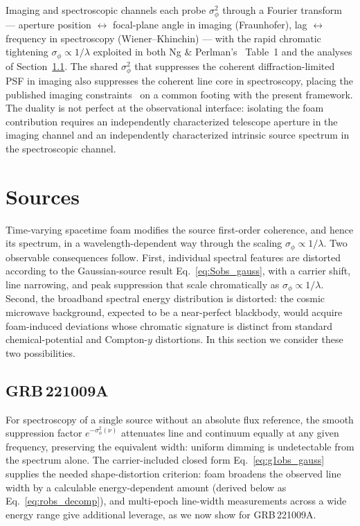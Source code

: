 \documentclass[aps,prd,onecolumn,amsmath,amssymb]{revtex4-2}
\begin{document}
Imaging and spectroscopic channels each probe $\sigma_\phi^2$ through
a Fourier transform --- aperture position $\leftrightarrow$ focal-plane
angle in imaging (Fraunhofer), lag $\leftrightarrow$ frequency in
spectroscopy (Wiener--Khinchin) --- with the rapid chromatic tightening
$\sigma_\phi\propto 1/\lambda$ exploited in both Ng \&
Perlman's~\cite{NgPerlman2022} Table~1 and the analyses of
Section~\ref{sec:grb221009a}.  The shared $\sigma_\phi^2$ that
suppresses the coherent diffraction-limited PSF in imaging also
suppresses the coherent line core in spectroscopy, placing the
published imaging
constraints~\cite{NgPerlman2022,LieuHillman2003,Christiansen2011,Perlman2015}
on a common footing with the present framework.  The duality is not
perfect at the observational interface: isolating the foam contribution
requires an independently characterized telescope aperture in the
imaging channel and an independently characterized intrinsic source
spectrum in the spectroscopic channel.

\section{Sources}
\label{sec:sources}

Time-varying spacetime foam modifies the source first-order coherence,
and hence its spectrum, in a wavelength-dependent way through
the scaling $\sigma_\phi \propto 1/\lambda$. Two observable
consequences follow. First, individual spectral features are distorted according to the
Gaussian-source result Eq.~\eqref{eq:Sobs_gauss}, with a carrier shift,
line narrowing, and peak suppression that scale chromatically as
$\sigma_\phi\propto1/\lambda$. Second, the
broadband spectral energy distribution is distorted: the cosmic
microwave background, expected to be a near-perfect blackbody, would
acquire foam-induced deviations whose chromatic signature is distinct
from standard chemical-potential and Compton-$y$ distortions.
In this section we consider these two possibilities.

\subsection{GRB\,221009A}
\label{sec:grb221009a}

For spectroscopy of a single source without an absolute flux reference,
the smooth suppression factor $e^{-\sigma_\phi^2(\nu)}$ attenuates line
and continuum equally at any given frequency, preserving the equivalent
width: uniform dimming is undetectable from the spectrum alone.  The
carrier-included closed form Eq.~\eqref{eq:g1obs_gauss} supplies the
needed shape-distortion criterion: foam broadens the observed line width
by a calculable energy-dependent amount (derived below as
Eq.~\eqref{eq:robs_decomp}), and multi-epoch line-width measurements
across a wide energy range give additional leverage, as we now show
for GRB\,221009A.
\end{document}
